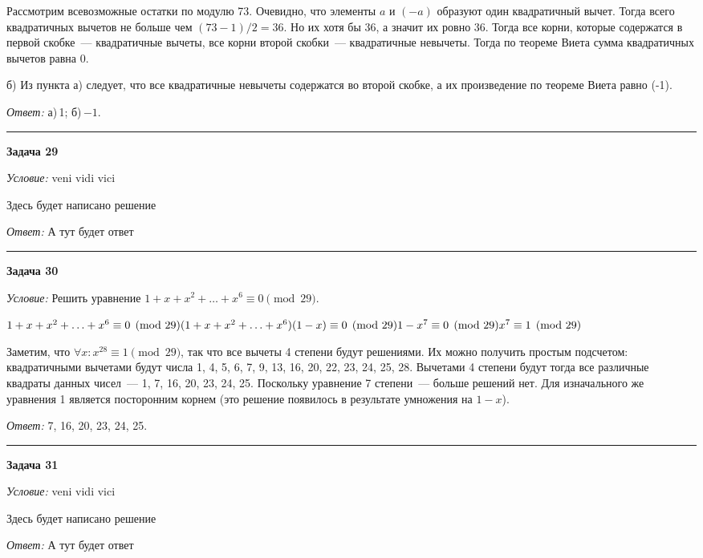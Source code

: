\documentclass[12pt,a4paper]{article}
\newcommand{\sbs}{\large \bfseries}
\newcommand{\rl}{\vspace{16pt} \hrule \vspace{8pt}}
\begin{document}
Рассмотрим всевозможные остатки по модулю 73. Очевидно, что элементы $a$ и $(-a)$ образуют один квадратичный вычет. Тогда всего квадратичных вычетов не больше чем $(73 - 1)/2 = 36$. Но их хотя бы 36, а значит их ровно 36. Тогда все корни, которые содержатся в первой скобке~--- квадратичные вычеты, все корни второй скобки~--- квадратичные невычеты. Тогда по теореме Виета сумма квадратичных вычетов равна 0.

б) Из пункта а) следует, что все квадратичные невычеты содержатся во второй скобке, а их произведение по теореме Виета равно (-1).

{\itshape Ответ: } а)\,1; б)\,$-1$.




\rl
{\sbs Задача 29}

{\itshape Условие: } veni vidi vici

Здесь будет написано решение

{\itshape Ответ: } А тут будет ответ




\rl
{\sbs Задача 30}

{\itshape Условие: } Решить уравнение $1+x+x^2+\ldots+x^6\equiv 0\pmod{29}$.

$1+x+x^2+\ldots+x^6\equiv 0\pmod{29}\\
(1+x+x^2+\ldots+x^6)(1-x)\equiv 0\pmod{29}\\
1-x^7\equiv 0\pmod{29}\\
x^7\equiv 1\pmod{29}$

Заметим, что $\forall x: x^{28}\equiv 1\pmod{29}$, так что все вычеты 4 степени будут решениями. Их можно получить простым подсчетом: квадратичными вычетами будут числа 1, 4, 5, 6, 7, 9, 13, 16, 20, 22, 23, 24, 25, 28. Вычетами 4 степени будут тогда все различные квадраты данных чисел~--- 1, 7, 16, 20, 23, 24, 25. Поскольку уравнение 7 степени~--- больше решений нет. Для изначального же уравнения 1 является посторонним корнем (это решение появилось в результате умножения на $1-x$).

{\itshape Ответ:} 7, 16, 20, 23, 24, 25.





\rl
{\sbs Задача 31}

{\itshape Условие: } veni vidi vici

Здесь будет написано решение

{\itshape Ответ: } А тут будет ответ
\end{document}
